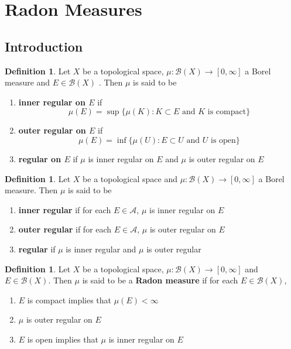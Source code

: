 \documentclass[12pt]{amsart}
\theoremstyle{definition}
\newtheorem{defn}[definition]{Definition}
\newcommand{\MA}{\mathcal{A}}
\newcommand{\MB}{\mathcal{B}}
\newcommand{\RG}{[0,\infty]}
\newcommand{\ld}[1]{\label{defn:#1}}
\begin{document}
	
	
	

	
	
	
	\newpage
	\section{Radon Measures}
	
	\subsection{Introduction}
	
	\begin{defn} \ld{00000} 
	Let $X$ be a topological space, $\mu: \MB(X) \rightarrow \RG$ a Borel measure and $E \in \MB(X)$ . Then $\mu$ is said to be 
	\begin{enumerate}
	\item \textbf{inner regular on $E$} if
	$$\mu(E) = \sup \{ \mu(K): K \subset E \text{ and $K$ is compact}\}$$
	\item \textbf{outer regular on $E$} if
	$$\mu(E) = \inf \{ \mu(U): E \subset U \text{ and $U$ is open}\}$$
	\item \textbf{regular on $E$} if $\mu$ is inner regular on $E$ and $\mu$ is outer regular on $E$
	\end{enumerate}
	\end{defn}
	
	\begin{defn} \ld{00000} 
	Let $X$ be a topological space and $\mu: \MB(X) \rightarrow \RG$ a Borel measure. Then $\mu$ is said to be 
	\begin{enumerate}
	\item  \textbf{inner regular} if for each $E \in \MA$, $\mu$ is inner regular on $E$
	\item  \textbf{outer regular} if for each $E \in \MA$, $\mu$ is outer regular on $E$
	\item  \textbf{regular} if $\mu$ is inner regular and $\mu$ is outer regular
	\end{enumerate}
	\end{defn}
	
	\begin{defn} \ld{00000} 
	Let $X$ be a topological space, $\mu: \MB(X) \rightarrow \RG$ and $E \in \MB(X)$. Then $\mu$ is said to be a \textbf{Radon measure} if for each $E \in \MB(X)$, 
	\begin{enumerate}
	\item $E$ is compact implies that $\mu(E) < \infty$
	\item $\mu$ is outer regular on $E$
	\item $E$ is open implies that $\mu$ is inner regular on $E$
	\end{enumerate}
	\end{defn}
	
\end{document}

